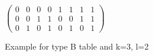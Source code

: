 \begin{figure}[H]
    \centering
    \(
    \begin{pmatrix}
        0 & 0 & 0 & 0 & 1 & 1 & 1 & 1 \\
        0 & 0 & 1 & 1 & 0 & 0 & 1 & 1 \\
        0 & 1 & 0 & 1 & 0 & 1 & 0 & 1
    \end{pmatrix}
    \)
    \caption{Example for type B table and k=3, l=2}\label{fig:graph_limit_B}
\end{figure}